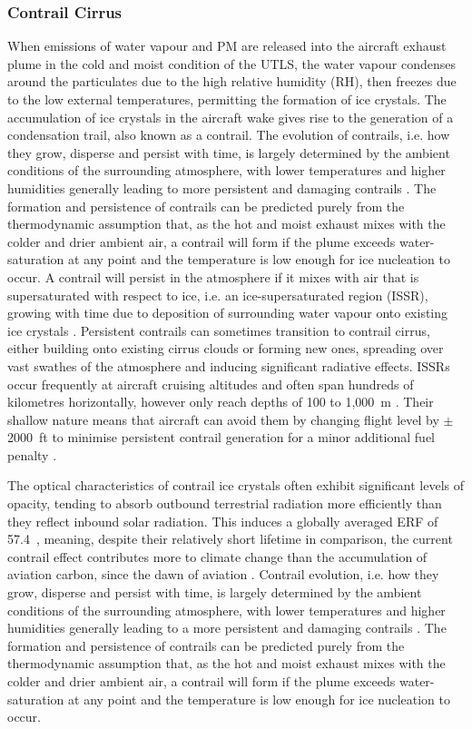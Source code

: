 \subsubsection{Contrail Cirrus}
When emissions of water vapour and PM are released into the aircraft exhaust plume in the cold and moist condition of the UTLS, the water vapour condenses around the particulates due to the high relative humidity (RH), then freezes due to the low external temperatures, permitting the formation of ice crystals. The accumulation of ice crystals in the aircraft wake gives rise to the generation of a condensation trail, also known as a contrail. The evolution of contrails, i.e. how they grow, disperse and persist with time, is largely determined by the ambient conditions of the surrounding atmosphere, with lower temperatures and higher humidities generally leading to more persistent and damaging contrails \cite{Schumann2005}. The formation and persistence of contrails can be predicted purely from the thermodynamic assumption that, as the hot and moist exhaust mixes with the colder and drier ambient air, a contrail will form if the plume exceeds water-saturation at any point and the temperature is low enough for ice nucleation to occur. A contrail will persist in the atmosphere if it mixes with air that is supersaturated with respect to ice, i.e. an ice-supersaturated region (ISSR), growing with time due to deposition of surrounding water vapour onto existing ice crystals \cite{Karcher2018, Schumann2005}. Persistent contrails can sometimes transition to contrail cirrus, either building onto existing cirrus clouds or forming new ones, spreading over vast swathes of the atmosphere \cite{Minnis1998} and inducing significant radiative effects. ISSRs occur frequently at aircraft cruising altitudes and often span hundreds of kilometres horizontally, however only reach depths of 100 to 1,000~m \cite{Spichtinger2016, Dickson2010}. Their shallow nature means that aircraft can avoid them by changing flight level by $\pm$2000~ft to minimise persistent contrail generation for a minor additional fuel penalty \cite{Schumann2011}.

The optical characteristics of contrail ice crystals often exhibit significant levels of opacity, tending to absorb outbound terrestrial radiation more efficiently than they reflect inbound solar radiation. This induces a globally averaged ERF of 57.4~, meaning, despite their relatively short lifetime in comparison, the current contrail effect contributes more to climate change than the accumulation of aviation carbon, since the dawn of aviation \cite{Burkhardt2011}. Contrail evolution, i.e. how they grow, disperse and persist with time, is largely determined by the ambient conditions of the surrounding atmosphere, with lower temperatures and higher humidities generally leading to a more persistent and damaging contrails \cite{Schumann2005}. The formation and persistence of contrails can be predicted purely from the thermodynamic assumption that, as the hot and moist exhaust mixes with the colder and drier ambient air, a contrail will form if the plume exceeds water-saturation at any point and the temperature is low enough for ice nucleation to occur. 

